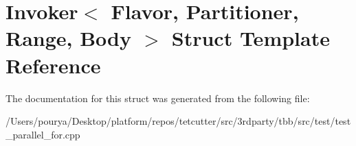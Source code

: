 \hypertarget{structInvoker}{}\section{Invoker$<$ Flavor, Partitioner, Range, Body $>$ Struct Template Reference}
\label{structInvoker}


The documentation for this struct was generated from the following file\+:\begin{DoxyCompactItemize}
\item 
/\+Users/pourya/\+Desktop/platform/repos/tetcutter/src/3rdparty/tbb/src/test/test\+\_\+parallel\+\_\+for.\+cpp\end{DoxyCompactItemize}

